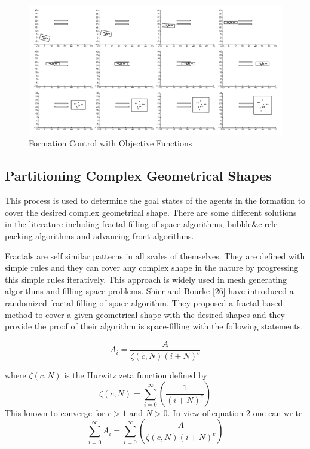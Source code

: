 \documentclass[twoside]{article}
\begin{document}
\begin{figure}[H]
	\caption{Formation Control with Objective Functions}
	\centering
	\includegraphics[scale = 1]{manifold}
\end{figure}



\subsection{Partitioning Complex Geometrical Shapes}


This process is used to determine the goal states of the agents in the formation to cover the desired complex geometrical shape. There are some different solutions in the literature including fractal filling of space algorithms, bubble$\&$circle packing algorithms and advancing front algorithms. 

Fractals are self similar  patterns in all scales of themselves. They are defined with simple rules and they can cover any complex shape in the nature by progressing this simple rules iteratively. This approach is widely used in mesh generating algorithms and filling space problems.  Shier and Bourke [26] have introduced a randomized fractal filling of space algorithm. They proposed a fractal based method to cover a given geometrical shape with the desired shapes and they provide the proof of their algorithm is space-filling with the following statements. 

	\begin{equation} %
	A_i = {\frac{A}{{\zeta(c,N)(i+N)^c}}}
	\end{equation}	
	
	where ${\zeta(c,N)}$ is the Hurwitz zeta function defined by 
	\begin{equation}
	\zeta(c,N) = \sum_{i=0}^{\infty}\left(\frac{1}{(i+N)^c}\right)
	\end{equation}
	This known to converge for $c>1$ and $N>0$. In view of equation 2 one can write
	\begin{equation}
	\sum_{i=0}^{\infty}A_i = \sum_{i = 0}^{\infty}\left(\frac{A}{\zeta(c,N)(i+N)^c}\right)
	\end{equation}
\end{document}
